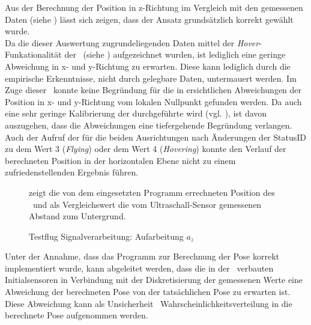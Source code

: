 \FloatBarrier
{}


Aus der Berechnung der Position in z-Richtung im Vergleich mit den gemessenen Daten (siehe ) lässt sich zeigen, dass der Ansatz grundsätzlich korrekt gewählt wurde.\\
Da die dieser Auswertung zugrundeliegenden Daten mittel der \textit{Hover}-Funkationalität der \Ar\ (siehe ) aufgezeichnet wurden, ist lediglich eine geringe Abweichung in x- und y-Richtung zu erwarten. Diese kann lediglich durch die empirische Erkenntnisse, nicht durch gelegbare Daten, untermauert werden.
Im Zuge dieser \Arbeit\ konnte keine Begründung für die in  ersichtlichen Abweichungen der Position in x- und y-Richtung vom lokalen Nullpunkt gefunden werden. Da auch eine sehr geringe Kalibrierung der  durchgeführte wird (vgl. ), ist davon auszugehen, dass die Abweichungen eine tiefergehende Begründung verlangen. Auch der Aufruf der  für die beiden Ausrichtungen nach Änderungen der StatusID zu dem Wert 3 (\textit{Flying}) oder dem Wert 4 (\textit{Hovering}) konnte den Verlauf der berechneten Position in der horizontalen Ebene nicht zu einem zufriedenstellenden Ergebnis führen.

\begin{figure}[ht!]
\vspace{0.25cm}
\begin{center}
\caption{Testflug Signalverarbeitung: Aufarbeitung $a_z$}
\label{fig:FlightPos}
\end{center}

\vspace{0.25cm}
 zeigt die von dem eingesetzten Programm errechneten Position des \Quad[s] \Ar\ und als Vergleichswert die vom Ultraschall-Sensor gemessenen Abstand zum Untergrund.
\end{figure}

Unter der Annahme, dass das Programm zur Berechnung der Pose korrekt implementiert wurde, kann abgeleitet werden, dass die in der \Ar\ verbauten Initialsensoren in Verbindung mit der Diskretisierung der gemessenen Werte eine Abweichung der berechneten Pose von der tatsächlichen Pose zu erwarten ist.
Diese Abweichung kann als Unsicherheit \bzw\ Wahrscheinlichkeitsverteilung in die berechnete Pose aufgenommen werden.






